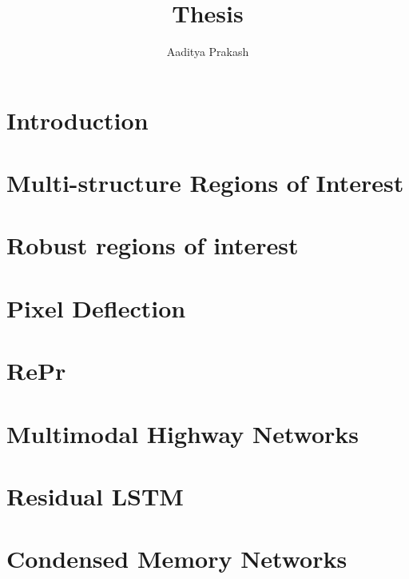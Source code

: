 \documentclass{brandeis-dissertationx}
\title{Thesis}
\author{Aaditya Prakash}
\begin{document}
\acknowledgments{}
\preface{}
\signaturepage*
\thesisfront[copyrightpage]




\listoffigures
\listoftables
\listofalgorithms



\chapter{Introduction}


\chapter{Multi-structure Regions of Interest}
% 

\chapter{Robust regions of interest}
% 

\chapter{Pixel Deflection}
% 

\chapter{RePr}
% 

\chapter{Multimodal Highway Networks}
% 

\chapter{Residual LSTM}
% 

\chapter{Condensed Memory Networks}
% 

\printbibliography
\end{document}
